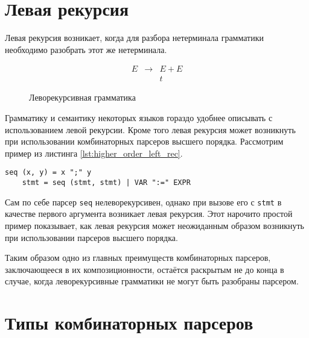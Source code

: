 \documentclass[times]{itmo-student-thesis}
\begin{document}
\section{Левая рекурсия}\label{sec:left_recursion}

Левая рекурсия возникает, когда для разбора нетерминала грамматики необходимо разобрать этот же нетерминала. 

\begin{figure}[!h]
    \caption{Леворекурсивная грамматика}\label{leftrec_grammar}
    \[
        \begin{array}{lll}
            E & \to & E+E \\
              &     & t
        \end{array}
    \]
\end{figure}

Грамматику и семантику некоторых языков гораздо удобнее описывать с использованием левой рекурсии. Кроме того
левая рекурсия может возникнуть при использовании комбинаторных парсеров высшего порядка. Рассмотрим пример из листинга 
\ref{lst:higher_order_left_rec}.

\begin{lstlisting}[float=!h,caption={Возникновение левой рекурсии},label={lst:higher_order_left_rec}]
    seq (x, y) = x ";" y
    stmt = seq (stmt, stmt) | VAR ":=" EXPR
\end{lstlisting}

Сам по себе парсер \lstinline{seq} нелеворекурсивен, однако при вызове его с \lstinline{stmt} в качестве первого аргумента возникает левая рекурсия.
Этот нарочито простой пример показывает, как левая рекурсия может неожиданным образом возникнуть при использовании
парсеров высшего порядка.

Таким образом одно из главных преимуществ комбинаторных парсеров, заключающееся в их композиционности, остаётся
раскрытым не до конца в случае, когда леворекурсивные грамматики не могут быть разобраны парсером.

\section{Типы комбинаторных парсеров}\label{sec:parser_combinators_types}
\end{document}
